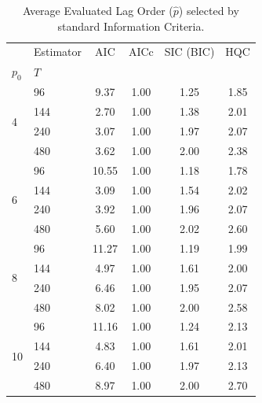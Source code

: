 \begin{table}[htbp]
\centering
\caption{Average Evaluated Lag Order ($\hat{p}$) selected by standard Information Criteria.}
\label{tab:ic_lag_orders}
\begin{tabular}{llcccc}
\toprule
 & Estimator & AIC & AICc & SIC (BIC) & HQC \\
$p_0$ & $T$ &  &  &  &  \\
\midrule
\multirow[t]{4}{*}{4} & 96 & 9.37 & 1.00 & 1.25 & 1.85 \\
 & 144 & 2.70 & 1.00 & 1.38 & 2.01 \\
 & 240 & 3.07 & 1.00 & 1.97 & 2.07 \\
 & 480 & 3.62 & 1.00 & 2.00 & 2.38 \\
\multirow[t]{4}{*}{6} & 96 & 10.55 & 1.00 & 1.18 & 1.78 \\
 & 144 & 3.09 & 1.00 & 1.54 & 2.02 \\
 & 240 & 3.92 & 1.00 & 1.96 & 2.07 \\
 & 480 & 5.60 & 1.00 & 2.02 & 2.60 \\
\multirow[t]{4}{*}{8} & 96 & 11.27 & 1.00 & 1.19 & 1.99 \\
 & 144 & 4.97 & 1.00 & 1.61 & 2.00 \\
 & 240 & 6.46 & 1.00 & 1.95 & 2.07 \\
 & 480 & 8.02 & 1.00 & 2.00 & 2.58 \\
\multirow[t]{4}{*}{10} & 96 & 11.16 & 1.00 & 1.24 & 2.13 \\
 & 144 & 4.83 & 1.00 & 1.61 & 2.01 \\
 & 240 & 6.40 & 1.00 & 1.97 & 2.13 \\
 & 480 & 8.97 & 1.00 & 2.00 & 2.70 \\
\bottomrule
\end{tabular}
\end{table}
